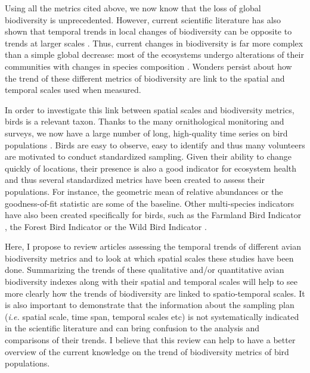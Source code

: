 \documentclass[
  12pt,
  oneside]{report}
\begin{document}
Using all the metrics cited above, we now know that the loss of global biodiversity is unprecedented. However, current scientific literature has also shown that temporal trends in local changes of biodiversity can be opposite to trends at larger scales \citep[\emph{e.g.}][]{chase_species_2019}. Thus, current changes in biodiversity is far more complex than a simple global decrease: most of the ecosystems undergo alterations of their communities with changes in species composition \citep{blowes_geography_2019, dornelas_quantifying_2013}. Wonders persist about how the trend of these different metrics of biodiversity are link to the spatial and temporal scales used when measured.

In order to investigate this link between spatial scales and biodiversity metrics, birds is a relevant taxon. Thanks to the many ornithological monitoring and surveys, we now have a large number of long, high-quality time series on bird populations \citep{bejcek_velke_2016}. Birds are easy to observe, easy to identify and thus many volunteers are motivated to conduct standardized sampling. Given their ability to change quickly of locations, their presence is also a good indicator for ecosystem health and thus several standardized metrics have been created to assess their populations. For instance, the geometric mean of relative abundances or the goodness-of-fit statistic \citep{studeny_goodness_2011} are some of the baseline. Other multi-species indicators have also been created specifically for birds, such as the Farmland Bird Indicator \citep{gregory_developing_2005}, the Forest Bird Indicator \citep{gregory_population_2007} or the Wild Bird Indicator \citep{gregory_wild_2010}.

Here, I propose to review articles assessing the temporal trends of different avian biodiversity metrics and to look at which spatial scales these studies have been done. Summarizing the trends of these qualitative and/or quantitative avian biodiversity indexes along with their spatial and temporal scales will help to see more clearly how the trends of biodiversity are linked to spatio-temporal scales. It is also important to demonstrate that the information about the sampling plan (\emph{i.e.} spatial scale, time span, temporal scales etc) is not systematically indicated in the scientific literature and can bring confusion to the analysis and comparisons of their trends. I believe that this review can help to have a better overview of the current knowledge on the trend of biodiversity metrics of bird populations.
\end{document}
